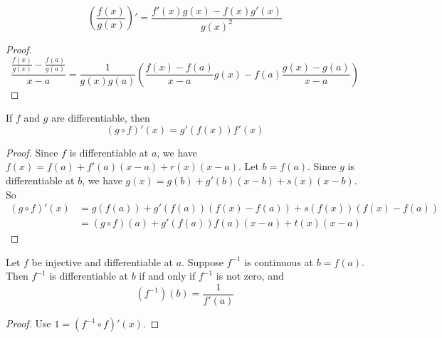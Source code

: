 \begin{theorem}
    \begin{equation}
        \left( \frac{f(x)}{g(x)} \right)' = \frac{f'(x)g(x) - f(x) g'(x)}{g(x)^2}
    \end{equation}    
\end{theorem}
\begin{proof}
    \begin{equation}
        \frac{\frac{f(x)}{g(x)} - \frac{f(a)}{g(a)}}{x - a} = \frac{1}{g(x) g(a)} \left( \frac{f(x) - f(a)}{x-a} g(x) - f(a) \frac{g(x) - g(a)}{x-a} \right)
    \end{equation}
\end{proof}

\begin{theorem}
    If $f$ and $g$ are differentiable, then
    \begin{equation}
        (g \circ f)'(x) = g'(f(x)) f'(x)
    \end{equation}    
\end{theorem}
\begin{proof}
    Since $f$ is differentiable at $a$, we have $f(x) = f(a) + f'(a)(x-a) + r(x)(x-a)$. Let $b = f(a)$. Since $g$ is differentiable at $b$, we have $g(x) = g(b) + g'(b)(x-b) + s(x)(x-b)$. So
    \begin{equation}
        \begin{aligned}
            (g \circ f)'(x) &= g(f(a)) + g'(f(a))(f(x) - f(a)) + s(f(x))(f(x) - f(a)) \\
            &= (g \circ f)(a) + g'(f(a))f(a)(x-a) + t(x)(x-a)
        \end{aligned}
    \end{equation}
\end{proof}

\begin{theorem}
    Let $f$ be injective and differentiable at $a$. Suppose $f^{-1}$ is continuous at $b=f(a)$. Then $f^{-1}$ is differentiable at $b$ if and only if $f^{-1}$ is not zero, and
    \begin{equation}
        (f^{-1})(b) = \frac{1}{f'(a)}
    \end{equation}
\end{theorem}
\begin{proof}
    Use $1 = (f^{-1} \circ f)'(x)$.
\end{proof}


